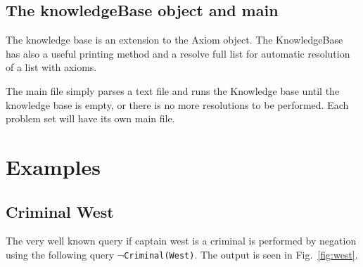 \documentclass{article}                     %
\begin{document}
	\subsection{The knowledgeBase object and main}
	The knowledge base is an extension to the Axiom object. The KnowledgeBase has also a useful printing method and a resolve full list for automatic resolution of a list with axioms. 
	
	The main file simply parses a text file and runs  the Knowledge base until the knowledge base is empty, or there is no more resolutions to be performed. 
	Each problem set will have its own main file. 
	
	\section{Examples}
	\subsection{Criminal West}
	The very well known query if captain west is a criminal is performed by negation using the following query \texttt{$ \neg$Criminal(West)}. The output is seen in Fig.~\ref{fig:west}.
\end{document}
